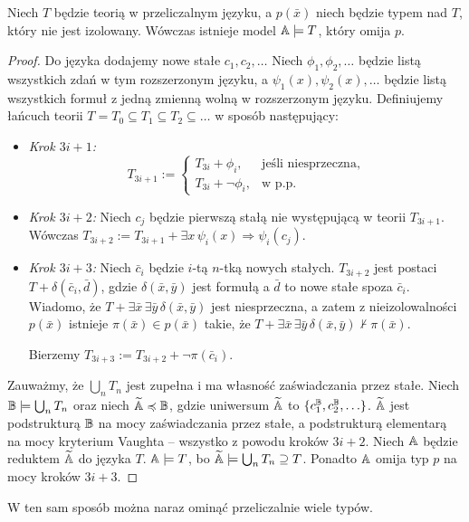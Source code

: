 \documentclass{article}
\begin{document}
\begin{tw}
	Niech $T$ będzie teorią w przeliczalnym języku, a $p(\bar{x})$ niech będzie typem nad $T$, który nie jest izolowany.
	Wówczas istnieje model $\mathbb{A} \models T$, który omija $p$.
\end{tw}
\begin{proof}
	Do języka dodajemy nowe stałe $c_1, c_2, \ldots$
	Niech $\phi_1, \phi_2, \ldots $ będzie listą wszystkich zdań w tym rozszerzonym języku, a $\psi_1(x), \psi_2(x), \ldots$ będzie listą wszystkich formuł z jedną zmienną wolną w rozszerzonym języku.
	Definiujemy łańcuch teorii $T = T_0 \subseteq T_1 \subseteq T_2 \subseteq \ldots$
	w sposób następujący:
	\begin{itemize}
		\item \textit{Krok $3i+1$:}
			\[
				 T_{3i+1} := \left\{\begin{array}{lr}
						 T_{3i} + \phi_i, & \text{jeśli niesprzeczna,}\\
						 T_{3i} + \neg \phi_i, & \text{w p.p.}
       						 \end{array}
			\]

		\item \textit{Krok $3i+2$:}
			Niech $c_j$ będzie pierwszą stałą nie występującą w teorii $T_{3i+1}$.
			Wówczas $T_{3i+2} := T_{3i+1} + \exists x \, \psi_i(x) \Rightarrow \psi_i(c_j)$.
		\item \textit{Krok $3i+3$:}
			Niech $\bar{c}_i$ będzie $i$-tą $n$-tką nowych stałych.
			$T_{3i+2}$ jest postaci $T + \delta(\bar{c}_i, \bar{d})$, gdzie $\delta(\bar{x}, \bar{y})$ jest formułą a $\bar{d}$ to nowe stałe spoza $\bar{c}_i$.
			Wiadomo, że $T + \exists \bar{x} \, \exists \bar{y} \, \delta(\bar{x}, \bar{y})$ jest niesprzeczna, a zatem z nieizolowalności $p(\bar{x})$ istnieje $\pi(\bar{x}) \in p(\bar{x})$ takie, że $T + \exists \bar{x} \, \exists \bar{y} \, \delta(\bar{x}, \bar{y}) \not \vdash \pi(\bar{x})$.

			Bierzemy $T_{3i+3} := T_{3i+2} + \neg \pi(\bar{c}_i)$.
	\end{itemize}
	Zauważmy, że $\bigcup_n T_n$ jest zupełna i ma własność zaświadczania przez stałe.
	Niech $\mathbb{B} \models \bigcup_n T_n$ oraz niech $\widetilde{\mathbb{A}} \preccurlyeq \mathbb{B}$, gdzie uniwersum $\widetilde{\mathbb{A}}$ to $\{c_1^{\mathbb{B}}, c_2^{\mathbb{B}}, \ldots\}$.
	$\widetilde{\mathbb{A}}$ jest podstrukturą $\mathbb{B}$ na mocy zaświadczania przez stałe, a podstrukturą elementarą na mocy kryterium Vaughta -- wszystko z powodu kroków $3i+2$.
	Niech $\mathbb{A}$ będzie reduktem $\widetilde{\mathbb{A}}$ do języka $T$.
	$\mathbb{A} \models T$, bo $\widetilde{\mathbb{A}} \models \bigcup_n T_n \supseteq T$.
	Ponadto $\mathbb{A}$ omija typ $p$ na mocy kroków $3i+3$.

\end{proof}
\begin{uw}
	 W ten sam sposób można naraz ominąć przeliczalnie wiele typów.
\end{uw}
\end{document}
